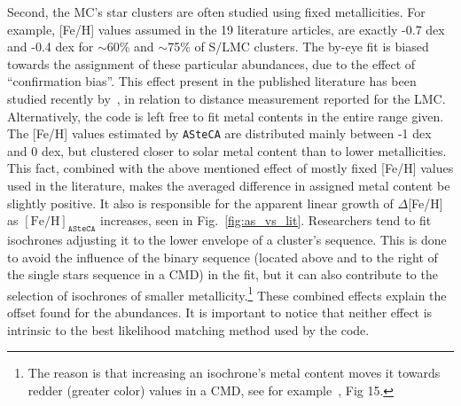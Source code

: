 \documentclass{aa}
\begin{document}
\noindent Second, the MC's star clusters are often studied
using fixed metallicities. For example, [Fe/H] values assumed in the 19
literature articles, are exactly -0.7 dex and -0.4 dex for $\sim$60\% and
$\sim$75\% of S/LMC clusters. The by-eye fit is biased towards the
assignment of these particular abundances, due to the effect
of ``confirmation bias''. This effect present in the published
literature has been studied recently by~\cite{de_Grijs_2014}, in relation to
distance measurement reported for the LMC.\@
Alternatively, the code is left free to fit metal contents in the
entire range given. The [Fe/H] values estimated by \texttt{ASteCA} are
distributed mainly between -1 dex and 0 dex, but clustered closer to solar
metal content than to lower metallicities. This fact, combined with the above
mentioned effect of mostly fixed [Fe/H] values used in the literature, makes the
averaged difference in assigned metal content be slightly positive.
It also is responsible for the apparent linear growth of $\Delta$[Fe/H] as
$\mathrm{[Fe/H]}_{\mathtt{ASteCA}}$ increases, seen in Fig.~\ref{fig:as_vs_lit}.
%
Researchers tend to fit isochrones adjusting it to the lower envelope of a
cluster's sequence. This is done to avoid the influence of the binary
sequence (located above and to the right of the single stars sequence in a CMD)
in the fit, but it can also contribute to the selection of
isochrones of smaller metallicity.\footnote{The reason is that increasing an
isochrone's metal content moves it towards redder (greater color) values in a
CMD, see for example~\cite{Bressan_2012}, Fig 15.}
%
These combined effects explain the offset found for the abundances. It is
important to notice that neither effect is intrinsic to the best likelihood
matching method used by the code.
\end{document}
